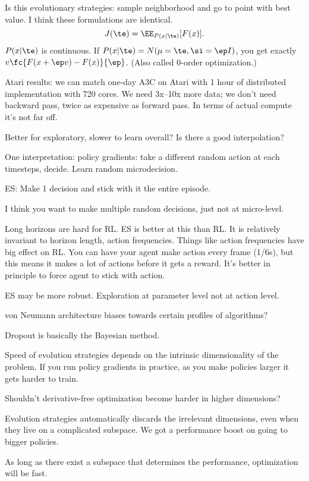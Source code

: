 Is this evolutionary strategies: sample neighborhood and go to point with best value. I think these formulations are identical. 
$$
J(\te) = \EE_{P(x|\te)} [F(x)]. 
$$
$P(x|\te)$ is continuous. If $P(x|\te)=N(\mu=\te, \si=\ep I)$, you get exactly $v\fc{F(x+\ep v)-F(x)}{\ep}$. 
(Also called 0-order optimization.)

Atari results: we can match one-day A3C on Atari with 1 hour of distributed implementation with 720 cores. We need 3x--10x more data; we don't need backward pass, twice as expensive as forward pass. In terms of actual compute it's not far off.

Better for exploratory, slower to learn overall? Is there a good interpolation? 

One interpretation: policy gradients: take a different random action at each timesteps, decide. Learn random microdecision. 

ES: Make 1 decision and stick with it the entire episode. 

I think you want to make multiple random decisions, just not at micro-level.

Long horizons are hard for RL. ES is better at this than RL. It is relatively invariant to horizon length, action frequencies. Things like action frequencies have big effect on RL. 
You can have your agent make action every frame (1/6s), but this means it makes a lot of actions before it gets a reward. 
It's better in principle to force agent to stick with action.

ES may be more robust. Exploration at parameter level not at action level. %

von Neumann architecture biases towards certain profiles of algorithms?

Dropout is basically the Bayesian method.

Speed of evolution strategies depends on the intrinsic dimensionality of the problem. If you run policy gradients in practice, as you make policies larger it gets harder to train. 

Shouldn't derivative-free optimization become harder in higher dimensions?

Evolution strategies automatically discards the irrelevant dimensions, even when they live on a complicated subspace. We got a performance boost on going to bigger policies.

As long as there exist a subspace that determines the performance, optimization will be fast.


